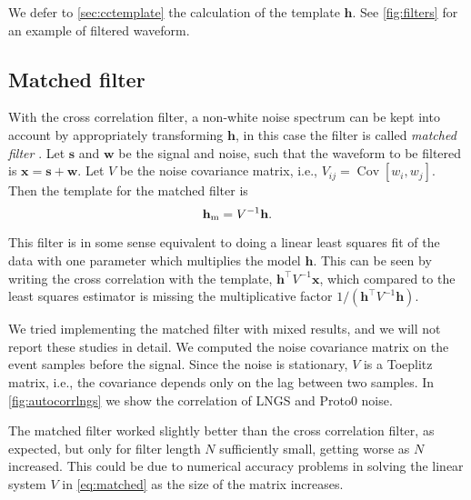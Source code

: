 We defer to \autoref{sec:cctemplate} the calculation of the template $\mathbf
h$. See \autoref{fig:filters} for an example of filtered waveform.

\begin{figure}
    
    

\end{figure}

\subsection{Matched filter}

With the cross correlation filter, a non-white noise spectrum can be kept into
account by appropriately transforming $\mathbf h$, in this case the filter is
called \emph{matched filter} \cite[161]{ferrante2015}. Let $\mathbf s$ and
$\mathbf w$ be the signal and noise, such that the waveform to be filtered is
$\mathbf x = \mathbf s + \mathbf w$. Let $V$ be the noise covariance matrix,
i.e., $V_{ij} = \operatorname{Cov}[w_i, w_j]$. Then the template for the
matched filter is
%
\begin{equation}
    \mathbf h_\text m = V^{-1} \mathbf h.
    \label{eq:matched}    
\end{equation}

This filter is in some sense equivalent to doing a linear least squares fit of
the data with one parameter which multiplies the model $\mathbf h$. This can be
seen by writing the cross correlation with the template, $\mathbf h^\top V^{-1}
\mathbf x$, which compared to the least squares estimator \cite[628]{zyla2020}
is missing the multiplicative factor $1/(\mathbf h^\top V^{-1} \mathbf h)$.

We tried implementing the matched filter with mixed results, and we will not
report these studies in detail. We computed the noise covariance matrix on the
event samples before the signal. Since the noise is stationary, $V$ is a
Toeplitz matrix, i.e., the covariance depends only on the lag between two
samples. In \autoref{fig:autocorrlngs} we show the correlation of LNGS and
Proto0 noise.

The matched filter worked slightly better than the cross correlation filter, as
expected, but only for filter length $N$ sufficiently small, getting worse as
$N$ increased. This could be due to numerical accuracy problems in solving the
linear system $V$ in \autoref{eq:matched} as the size of the matrix increases.

